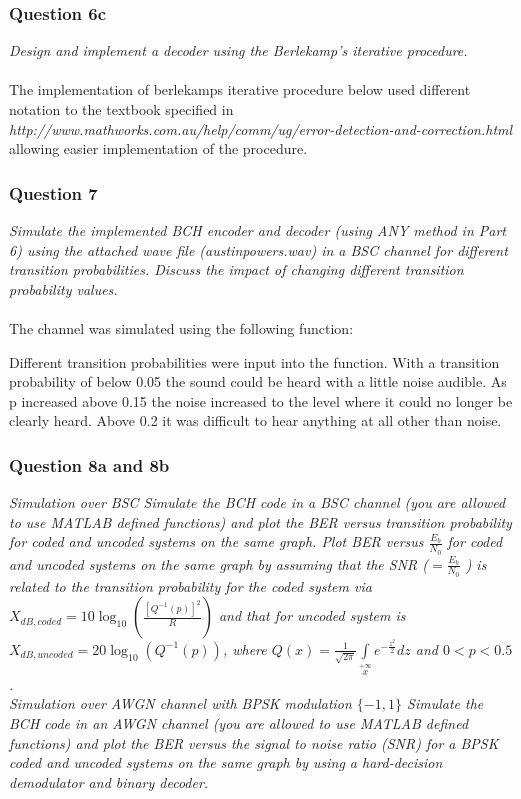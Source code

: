 \documentclass[a4paper]{article}
\begin{document}


\subsubsection*{Question 6c} \textit{Design and implement a decoder using the Berlekamp’s iterative procedure.}\\
\\
The implementation of berlekamps iterative procedure below used different notation to the textbook specified in \textit{http://www.mathworks.com.au/help/comm/ug/error-detection-and-correction.html} allowing easier implementation of the procedure.



\subsubsection*{Question 7} \textit{Simulate the implemented BCH encoder and decoder (using ANY method in Part 6) using the attached wave file (austinpowers.wav) in a BSC channel for different transition probabilities. Discuss the impact of changing different transition probability values.}\\
\\
The channel was simulated using the following function:



Different transition probabilities were input into the function. With a transition probability of below 0.05 the sound could be heard with a little noise audible. As p increased above 0.15 the noise increased to the level where it could no longer be clearly heard. Above 0.2 it was difficult to hear anything at all other than noise.

\subsubsection*{Question 8a and 8b} \textit{Simulation over BSC Simulate the BCH code in a BSC channel (you are allowed to use MATLAB defined functions) and plot the BER versus transition probability for coded and uncoded systems on the same graph. Plot BER versus $\frac{E_b}{N_0}$ for coded and uncoded systems on the same graph by assuming that the SNR ($ = \frac{E_b}{N_0}$ ) is related to the transition probability for the coded system via $X_{dB,coded} = 10 \log_{10}(\frac{[Q^{- 1} (p)]^2}{R}) $ and that for uncoded system is $X_{dB,uncoded} = 20\log_{10}(Q^{- 1} (p)) $, where $Q(x) = \frac{1}{\sqrt{2 \pi}} \int\limits_{x}\limits^{+\infty} e^{ -\frac{z^2}{2}} dz $ and $0 < p < 0.5$.}\\
\textit{Simulation over AWGN channel with BPSK modulation $\{−1, 1\}$ Simulate the BCH code in an AWGN channel (you are allowed to use MATLAB defined functions) and plot the BER versus the signal to noise ratio (SNR) for a BPSK coded and uncoded systems on the same graph by using a hard-decision demodulator and binary decoder.}\\
\\

\end{document}
